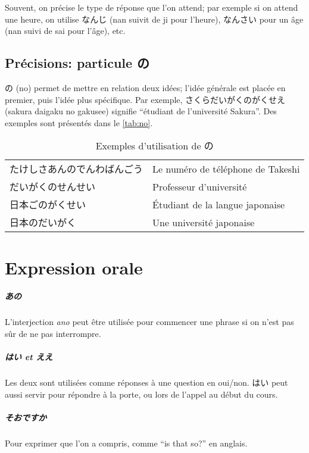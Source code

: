 \documentclass[a4paper,10pt,french,openany]{memoir}
\begin{document}
Souvent, on précise le type de réponse que l'on attend; par exemple si on attend une heure, on utilise なんじ (nan suivit de ji pour l'heure), なんさい pour un âge (nan suivi de sai pour l'âge), etc.

\section{Précisions: particule の}

の (no) permet de mettre en relation deux idées; l'idée générale est placée en premier, puis l'idée plus spécifique. Par exemple, さくらだいがくのがくせえ (sakura daigaku no gakusee) signifie ``étudiant de l'université Sakura''. Des exemples sont présentés dans le \autoref{tab:no}.

\begin{table}[htbp]
 \centering
 \begin{tabular}{ll}
  たけしさあんのでんわばんごう & Le numéro de téléphone de Takeshi \\
  だいがくのせんせい & Professeur d'université \\
  日本ごのがくせい & Étudiant de la langue japonaise \\
  日本のだいがく & Une université japonaise
 \end{tabular}
 \caption{Exemples d'utilisation de の}
 \label{tab:no}
\end{table}

\chapter{Expression orale}

\paragraph{あの}
L'interjection \emph{ano} peut être utilisée pour commencer une phrase si on n'est pas sûr de ne pas interrompre.

\paragraph{はい et ええ}
Les deux sont utilisées comme réponses à une question en oui/non. はい peut aussi servir pour répondre à la porte, ou lors de l'appel au début du cours.

\paragraph{そおですか}
Pour exprimer que l'on a compris, comme ``is that so?'' en anglais.
\end{document}
